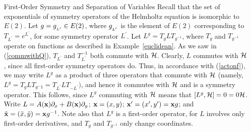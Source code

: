 \begin{section}{First-Order Symmetry and Separation of Variables}
Recall that the set of exponentials of symmetry operators of the Helmholtz equation is isomorphic to $E(2)$.  Let $g = g_{_{L^\prime}} \in E(2)$, where $g_{_{L^\prime}}$ is the element of $E(2)$ corresponding to $T_{L^\prime} = e^{L^\prime}$, for some symmetry operator $L^\prime$.  Let $L^g = T_g L T_{g^{-1}}$, where $T_g$ and $T_{g^{-1}}$ operate on functions as described in Example~\ref{euclidean}.  As we saw in (\ref{commwithQ}), $T_{L^\prime}$ and $T_{L^\prime}^{-1}$ both commute with $\mathcal{H}$.  Clearly, $L$ commutes with $\mathcal{H}$, since all first-order symmetry operators do.  Thus, in accordance with (\ref{actonf}), we may write $L^g$ as a product of three operators that commute with $\mathcal{H}$ (namely, $L^g = T_gLT_{g^-1} = T_{L^\prime}LT_{-L^\prime})$, and hence it commutes with $\mathcal{H}$ and is a symmetry operator.  This follows, since $L^g$ commuting with $\mathcal{H}$ means that $[L^g,\mathcal{H}] = 0 = 0\mathcal{H}$.  Write $L = A(\mathbf{x}) \partial_{x} + B(\mathbf{x}) \partial_{y}$; $\mathbf{x} = (x,y)$; $\mathbf{x}^\prime = (x^\prime,y^\prime) = \mathbf{x} g$; and $\tilde{\mathbf{x}} = (\tilde{x},\tilde{y}) = \mathbf{x} g^{-1}$.  Note also that $L^g$ is a first-order operator, for $L$ involves only first-order derivatives, and $T_g$ and $T_{g^{-1}}$ only change coordinates.

\end{section}

